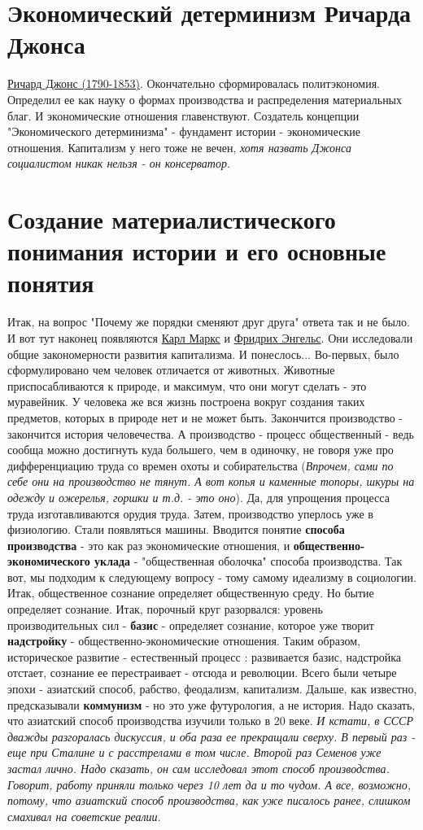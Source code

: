 \section{Экономический детерминизм Ричарда Джонса}
\underline{Ричард Джонс (1790-1853)}. Окончательно сформировалась политэкономия. Определил ее как науку о формах производства и распределения материальных благ. И экономические отношения главенствуют. Создатель концепции "Экономического детерминизма" - фундамент истории - экономические отношения. Капитализм у  него тоже не вечен, \textit{хотя назвать Джонса социалистом никак нельзя - он консерватор}. 

\section{Создание материалистического понимания истории и его основные понятия}
Итак, на вопрос "Почему же порядки сменяют друг друга" ответа так и не было. И вот тут наконец появляются \underline{Карл Маркс} и \underline{Фридрих Энгельс}. Они исследовали общие закономерности развития капитализма. И понеслось... Во-первых, было сформулировано чем человек отличается от животных. Животные приспосабливаются к природе, и максимум, что они могут сделать - это муравейник. У человека же вся жизнь построена вокруг создания таких предметов, которых в природе нет и не может быть. Закончится производство - закончится история человечества. А производство - процесс общественный - ведь сообща можно достигнуть куда большего, чем в одиночку, не говоря уже про дифференциацию труда со времен охоты и собирательства (\textit{Впрочем, сами по себе они на производство не тянут. А вот копья и каменные топоры, шкуры на одежду и ожерелья, горшки и т.д.  - это оно}). Да, для упрощения процесса труда изготавливаются орудия труда. Затем, производство уперлось уже в физиологию. Стали появляться машины. Вводится понятие \textbf{способа производства} - это как раз экономические отношения, и \textbf{общественно-экономического уклада} - "общественная оболочка" способа производства. Так вот, мы подходим к следующему вопросу - тому самому идеализму в социологии. Итак, общественное сознание определяет общественную среду. Но бытие определяет сознание. Итак, порочный круг разорвался: уровень производительных сил - \textbf{базис} - определяет сознание, которое уже творит \textbf{надстройку} - общественно-экономические отношения. Таким образом, историческое развитие - естественный процесс : развивается базис, надстройка отстает, сознание ее перестраивает - отсюда и революции. Всего были четыре эпохи - азиатский способ, рабство, феодализм, капитализм. Дальше, как известно, предсказывали \textbf{коммунизм}  - но это уже футурология, а не история. Надо сказать, что азиатский способ производства изучили только в 20 веке. \textit{И кстати, в СССР  дважды разгоралась дискуссия, и оба раза ее прекращали сверху. В первый раз - еще при Сталине и с расстрелами в том числе. Второй раз Семенов уже застал лично. Надо сказать, он сам исследовал этот способ производства. Говорит, работу приняли только через 10 лет да и то чудом. А все, возможно, потому, что азиатский способ производства, как уже писалось ранее, слишком смахивал на советские реалии}.


